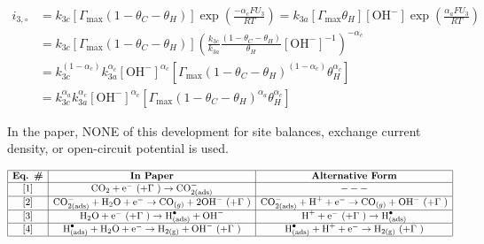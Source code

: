 \documentclass[12pt]{article}
\begin{document}
  \begin{equation*}
  \begin{split}
    i_{3, \circ} &= k_{3c} \left[\Gamma_{\max} (1 - \theta_C - \theta_H) \right] \exp{ \left( \frac{-\alpha_c F U_3}{RT} \right)}
    = k_{3a} \left[ \Gamma_{\max} \theta_H \right] \left[\text{OH}^- \right] \exp{\left( \frac{\alpha_a F U_3}{RT} \right)}
    \\
    & = k_{3c} \left[\Gamma_{\max} (1 - \theta_C - \theta_H) \right]
    \left( \frac{k_{3c}}{k_{3a}} \frac{(1 - \theta_C - \theta_H)}{\theta_H} \left[\text{OH}^- \right]^{-1} \right)^{-\alpha_c}
    \\
    & = k_{3c}^{(1-\alpha_c)} k_{3a}^{\alpha_c} \left[\text{OH}^- \right]^{\alpha_c} \left[\Gamma_{\max} (1 - \theta_C - \theta_H)^{(1-\alpha_c)} \theta_H^{\alpha_c} \right]
    \\
    & = k_{3c}^{\alpha_a} k_{3a}^{\alpha_c} \left[\text{OH}^- \right]^{\alpha_c} \left[\Gamma_{\max} (1 - \theta_C - \theta_H)^{\alpha_a} \theta_H^{\alpha_c} \right]
    \end{split}
  \end{equation*}

  \clearpage
  In the paper, NONE of this development for site balances, exchange current density, or open-circuit potential is used.

  \begin{table}[h]
  \setcellgapes{5pt}
  \makegapedcells
  \centering
    $\begin{array}{| c | c | c |}
    \hline
    \text{\textbf{Eq. \#}} & \text{\textbf{In Paper}} & \text{\textbf{Alternative Form}} \\
    \hline

    [1] &
    \text{CO}_2 + \text{e}^- \ (+ \Gamma \ ) \rightarrow \text{CO}^-_{2(\text{ads})} &
    --- \\
    \hline

    [2] &
    \text{CO}_{2(\text{ads})}^{-} + \text{H}_2\text{O} + \text{e}^- \rightarrow \text{CO}_{(g)} + 2\text{OH}^- \ (+ \Gamma \ ) &
    \text{CO}_{2(\text{ads})}^{-} + \text{H}^+ + \text{e}^- \rightarrow \text{CO}_{(g)} + \text{OH}^- \ (+ \Gamma \ )
    \\
    \hline

    [3] &
    \text{H}_2\text{O} + \text{e}^- \ (+ \Gamma \ ) \rightarrow \text{H}^{\bullet}_{(\text{ads})} + \text{OH}^- &
    \text{H}^+ + \text{e}^- \ (+ \Gamma \ ) \rightarrow \text{H}^{\bullet}_{(\text{ads})} \\
    \hline

    [4] &
    \text{H}^{\bullet}_{(\text{ads})} + \text{H}_2\text{O} + \text{e}^- \rightarrow \text{H}_{2(\text{g})} + \text{OH}^- \ (+ \Gamma \ ) &
    \text{H}^{\bullet}_{(\text{ads})} + \text{H}^+ + \text{e}^- \rightarrow \text{H}_{2(\text{g})} \ (+ \Gamma \ ) \\
    \hline

    \end{array}$
  \end{table}
\end{document}
